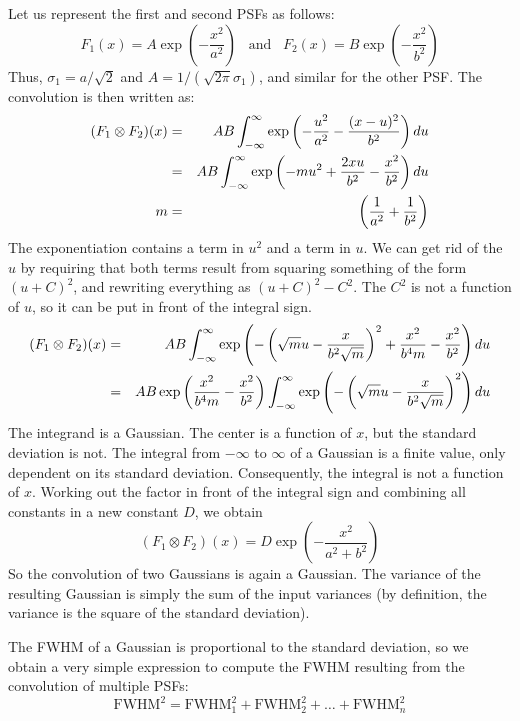 Let us represent the first and second PSFs as follows:
\begin{equation}
  F_1(x) = A \exp\left( -\frac{x^2}{a^2}\right)  \;\;\; \mbox{and} \;\;\;
  F_2(x) = B \exp\left( -\frac{x^2}{b^2}\right)
\end{equation}
Thus, $\sigma_1 = a / \sqrt{2}$ and $A = 1 / (\sqrt{2 \pi} \sigma_1)$, and
similar for the other PSF. The convolution is then written as:
%
\begin{eqnarray}
(F_1 \otimes F_2)(x) & = &
  AB \int_{-\infty}^{\infty} \exp\left(- \frac{u^2}{a^2} - \frac{(x-u)^2}{b^2}\right) du\\
& = & AB \int_{-\infty}^{\infty} \exp\left(- m u^2   + \frac{2xu}{b^2} - \frac{x^2}{b^2}\right)
  du \\
m & = & \left( \frac{1}{a^2} + \frac{1}{b^2}\right)
\end{eqnarray}
%
The exponentiation contains a term in $u^2$ and a term in $u$. We can get rid of
the $u$ by requiring that both terms result from squaring something of the
form $(u + C)^2$, and rewriting everything as $(u + C)^2 - C^2$. The $C^2$ is
not a function of $u$, so it can be put in front of the integral sign.
% 
\begin{eqnarray}
 (F_1 \otimes F_2)(x)  &  = & AB \int_{-\infty}^{\infty} \exp\left(- \left( \sqrt{m} u 
         - \frac{x}{b^2 \sqrt{m}} \right)^2
       + \frac{x^2}{b^4 m}
       - \frac{x^2}{b^2}\right) du\\
 & = &  AB \exp\left(\frac{x^2}{b^4 m} - \frac{x^2}{b^2}\right)
     \int_{-\infty}^{\infty} \exp\left(- \left( \sqrt{m} u 
         - \frac{x}{b^2 \sqrt{m}} \right)^2\right) du
\end{eqnarray}
The integrand is a Gaussian. The center is a function of $x$, but the standard
deviation is not. The integral from $-\infty$ to $\infty$ of a Gaussian is a
finite value, only dependent on its standard deviation. Consequently, the
integral is not a function of $x$. Working out the factor in front of the
integral sign and combining all constants in a new constant $D$, we obtain
%
\begin{equation}
 (F_1 \otimes F_2)(x) =  D \exp\left(-\frac{x^2}{a^2 + b^2}\right)
\end{equation}
%
So the convolution of two Gaussians is again a Gaussian. The variance of the
resulting Gaussian is simply the sum of the input variances (by definition, the
variance is the square of the standard deviation).

The FWHM of a Gaussian is proportional to the standard deviation, so we obtain
a very simple expression to compute the FWHM resulting from the convolution of
multiple PSFs:
\begin{equation}
 \mbox{FWHM}^2 = \mbox{FWHM}_1^2 + \mbox{FWHM}_2^2 + \ldots + \mbox{FWHM}_n^2
\end{equation}

